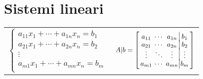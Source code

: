 \section{Sistemi lineari}
\begin{tabular}{@{}l@{}l@{}}
	$\begin{cases}
		a_{11}x_1 + \cdots + a_{1n}x_n = b_1 \\[-0.3em]
		a_{21}x_1 + \cdots + a_{2n}x_n = b_2 \\[-0.3em]
		\vdots \\[-0.3em]
		a_{m1}x_1 + \cdots + a_{mn}x_n = b_m \\
	\end{cases}$ &
	$A|b = \left[
		\arraycolsep=1.7pt\def\arraystretch{1.2}
		\begin{array}{ccc|c}
			a_{11} & \cdots & a_{1n} & b_1 \\[-0.3em]
			a_{21} & \cdots & a_{2n} & b_2 \\[-0.3em]
			\vdots & \ddots & \vdots & \vdots \\[-0.3em]
			a_{m1} & \cdots & a_{mn} & b_m \\
		\end{array}
		\right]$
\end{tabular}
